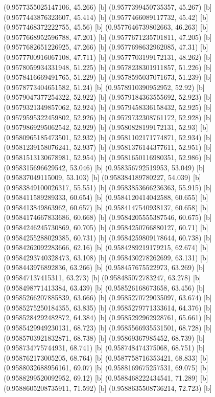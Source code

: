 {{{(0.9577355025147106, 45.266) [b] 
(0.9577399450735357, 45.267) [b] 
(0.9577443876323607, 45.414) [b] 
(0.9577466089117732, 45.42) [b] 
(0.9577468372222755, 45.56) [b] 
(0.9577646739802663, 46.263) [b] 
(0.9577668952596788, 47.201) [b] 
(0.9577671235701811, 47.205) [b] 
(0.9577682651226925, 47.266) [b] 
(0.9577698632962085, 47.31) [b] 
(0.9577700916067108, 47.711) [b] 
(0.9577703199172131, 48.262) [b] 
(0.9578059934331948, 51.225) [b] 
(0.9578238301911857, 51.226) [b] 
(0.9578416669491765, 51.229) [b] 
(0.9578595037071673, 51.239) [b] 
(0.9578773404651582, 51.24) [b] 
(0.9578910390952952, 52.92) [b] 
(0.9579047377254322, 52.922) [b] 
(0.9579184363555692, 52.923) [b] 
(0.9579321349857062, 52.924) [b] 
(0.9579458336158432, 52.925) [b] 
(0.9579595322459802, 52.926) [b] 
(0.9579732308761172, 52.928) [b] 
(0.9579869295062542, 52.929) [b] 
(0.9580828199172131, 52.93) [b] 
(0.9580965185473501, 52.932) [b] 
(0.9581102171774871, 52.934) [b] 
(0.9581239158076241, 52.937) [b] 
(0.9581376144377611, 52.951) [b] 
(0.9581513130678981, 52.954) [b] 
(0.9581650116980351, 52.986) [b] 
(0.958315696629542, 53.046) [b] 
(0.958356792519953, 53.049) [b] 
(0.95837049115009, 53.103) [b] 
(0.958384189780227, 54.039) [b] 
(0.9583849100026317, 55.551) [b] 
(0.9583853666236363, 55.915) [b] 
(0.958411589289333, 60.654) [b] 
(0.9584120414042588, 60.655) [b] 
(0.958413849863962, 60.657) [b] 
(0.9584147540938137, 60.658) [b] 
(0.9584174667833686, 60.668) [b] 
(0.9584205555387546, 60.675) [b] 
(0.9584246245730869, 60.705) [b] 
(0.9584250766880127, 60.71) [b] 
(0.9584255288029385, 60.731) [b] 
(0.9584259809178644, 60.738) [b] 
(0.9584262092283666, 62.16) [b] 
(0.9584289219179215, 62.674) [b] 
(0.9584293740328473, 63.108) [b] 
(0.958430278262699, 63.131) [b] 
(0.958443976892836, 63.266) [b] 
(0.958457675522973, 63.269) [b] 
(0.95847137415311, 63.273) [b] 
(0.958485072783247, 63.278) [b] 
(0.958498771413384, 63.439) [b] 
(0.958526168673658, 63.456) [b] 
(0.9585266207885839, 63.666) [b] 
(0.9585270729035097, 63.674) [b] 
(0.9585275250184355, 63.835) [b] 
(0.9585279771333614, 64.376) [b] 
(0.9585284292482872, 64.384) [b] 
(0.9585292962928761, 65.661) [b] 
(0.9585429949230131, 68.723) [b] 
(0.9585566935531501, 68.728) [b] 
(0.9585703921832871, 68.738) [b] 
(0.95869367985452, 68.739) [b] 
(0.958734775744931, 68.741) [b] 
(0.958748474375068, 68.751) [b] 
(0.958762173005205, 68.764) [b] 
(0.9587758716353421, 68.833) [b] 
(0.9588032688956161, 69.07) [b] 
(0.9588169675257531, 69.075) [b] 
(0.9588299520092952, 69.12) [b] 
(0.9588468222434541, 71.289) [b] 
(0.9588605208735911, 71.592) [b] 
(0.9588635508736214, 72.723) [b] 
}}}
